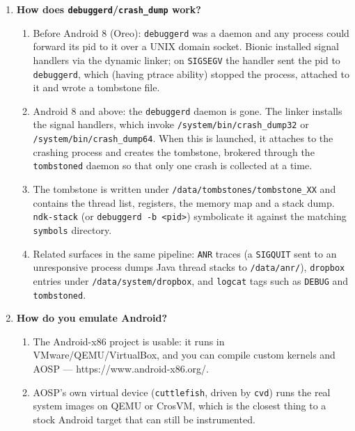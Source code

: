 \documentclass[12pt]{Training}
\begin{document}
\begin{enumerate}
\begin{enumerate}
        \item Wi-Fi --- the supplicant and the Broadcom/Qualcomm firmware beneath it (\lstinline{Broadpwn}, CVE-2017-9417) are reachable from radio range.
        \item Over-the-air messaging: MMS and the media parsers behind it, the surface that carried Stagefright (CVE-2015-3864).
    \end{enumerate}
    \item \textbf{How does \lstinline{debuggerd}/\lstinline{crash_dump} work?}
    \begin{enumerate}
        \item Before Android 8 (Oreo): \lstinline{debuggerd} was a daemon and any process could forward its pid to it over a UNIX domain socket. Bionic installed signal handlers via the dynamic linker; on \lstinline{SIGSEGV} the handler sent the pid to \lstinline{debuggerd}, which (having ptrace ability) stopped the process, attached to it and wrote a tombstone file.
        \item Android 8 and above: the \lstinline{debuggerd} daemon is gone. The linker installs the signal handlers, which invoke \lstinline{/system/bin/crash_dump32} or \lstinline{/system/bin/crash_dump64}. When this is launched, it attaches to the crashing process and creates the tombstone, brokered through the \lstinline{tombstoned} daemon so that only one crash is collected at a time.
        \item The tombstone is written under \lstinline{/data/tombstones/tombstone_XX} and contains the thread list, registers, the memory map and a stack dump. \lstinline{ndk-stack} (or \lstinline{debuggerd -b <pid>}) symbolicate it against the matching \lstinline{symbols} directory.
        \item Related surfaces in the same pipeline: \lstinline{ANR} traces (a \lstinline{SIGQUIT} sent to an unresponsive process dumps Java thread stacks to \lstinline{/data/anr/}), \lstinline{dropbox} entries under \lstinline{/data/system/dropbox}, and \lstinline{logcat} tags such as \lstinline{DEBUG} and \lstinline{tombstoned}.
    \end{enumerate}
    \item \textbf{How do you emulate Android?}
    \begin{enumerate}
        \item The Android-x86 project is usable: it runs in VMware/QEMU/VirtualBox, and you can compile custom kernels and AOSP --- https://www.android-x86.org/.
        \item AOSP's own virtual device (\lstinline{cuttlefish}, driven by \lstinline{cvd}) runs the real system images on QEMU or CrosVM, which is the closest thing to a stock Android target that can still be instrumented.

\end{enumerate}
\end{enumerate}
\end{document}
